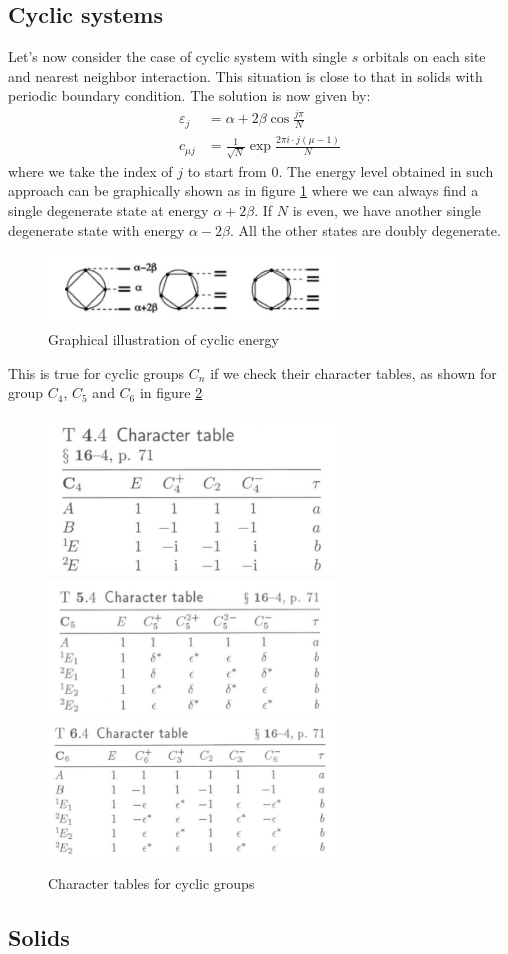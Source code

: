 \documentclass{article}
\begin{document}
\subsection{Cyclic systems}
Let's now consider the case of cyclic system with single $s$ orbitals on each site and nearest neighbor interaction. 
This situation is close to that in solids with periodic boundary condition. The solution is now given by:
\begin{align*}
    \varepsilon_j &= \alpha + 2 \beta \cos\frac{j\pi}{N} \\ 
    c_{\mu j} &= \frac{1}{\sqrt{N}} \exp \frac{2\pi i \cdot j (\mu-1)}{N} 
\end{align*}
where we take the index of $j$ to start from 0. 
The energy level obtained in such approach can be graphically shown as in figure \ref{F:cyclic_energy} 
where we can always find a single degenerate state at energy $\alpha + 2 \beta$. If $N$ is even, we have 
another single degenerate state with energy $\alpha - 2 \beta$. All the other states are doubly degenerate. 
\begin{figure}[h!]
    \centering
    \includegraphics[width=3in]{F_cyclic_energy.png}
    \caption{Graphical illustration of cyclic energy}
    \label{F:cyclic_energy}
\end{figure}
This is true for cyclic groups $C_n$ if we check their character tables, as shown for group $C_4$, $C_5$ and 
$C_6$ in figure \ref{F_cyclic_group_table}

\begin{figure}[h!]
    \centering
    \includegraphics[width=3in]{F_C4.png}
    \includegraphics[width=3in]{F_C5.png}
    \includegraphics[width=3in]{F_C6.png}
    \caption{Character tables for cyclic groups}
    \label{F_cyclic_group_table}
\end{figure}

\subsection{Solids}
\end{document}
